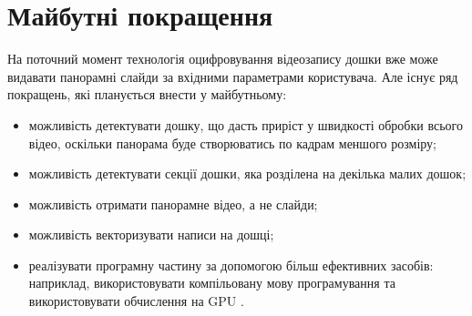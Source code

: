 \section{Майбутні покращення}

На поточний момент технологія оцифровування відеозапису дошки вже може
видавати панорамні слайди за вхідними параметрами користувача. Але існує
ряд покращень, які планується внести у майбутньому:

\begin{itemize}
    \item можливість детектувати дошку, що дасть приріст у швидкості обробки
          всього відео, оскільки панорама буде створюватись по кадрам меншого розміру;
    \item можливість детектувати секції дошки, яка розділена на декілька малих дошок;
    \item можливість отримати панорамне відео, а не слайди;
    \item можливість векторизувати написи на дошці;
    \item реалізувати програмну частину за допомогою більш ефективних засобів:
      наприклад, використовувати компільовану мову програмування
      та використовувати обчислення на GPU \cite{bib:cuda,bib:opencl}.
\end{itemize}

\clearpage
